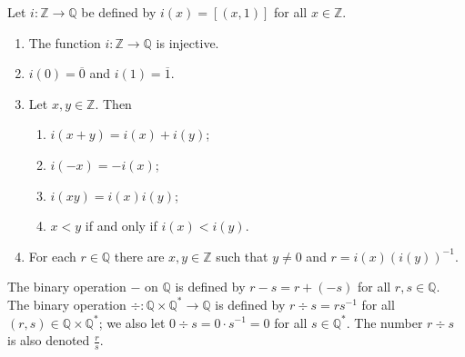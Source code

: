 \begin{theorem} %
	\label{rat:t:int}
	Let $i: \mathbb{Z} \to \mathbb{Q}$ be defined by $i(x) = [(x, 1)]$ for all $x \in \mathbb{Z}$.
	\begin{enumerate}
		\item \label{rat:t:int:injective}
		      The function $i: \mathbb{Z} \to \mathbb{Q}$ is injective.
		\item \label{rat:t:int:zero_one}
		      $i(0) = \overline{0}$ and $i(1) = \overline{1}$.
		\item \label{rat:t:int:props}
		      Let $x, y \in \mathbb{Z}$. Then
		      \begin{enumerate}
			      \item \label{rat:t:int:props:add}
			            $i(x + y) = i(x) + i(y)$;
			      \item \label{rat:t:int:props:neg}
			            $i(-x) = -i(x)$;
			      \item \label{rat:t:int:props:mult}
			            $i(x y) = i(x) i(y)$;
			      \item \label{rat:t:int:props:less}
			            $x < y$ if and only if $i(x) < i(y)$.
		      \end{enumerate}
		\item \label{rat:t:int:div}
		      For each $r \in \mathbb{Q}$ there are $x, y \in \mathbb{Z}$ such that $y \neq 0$ and $r = i(x)(i(y))^{-1}$.
	\end{enumerate}
\end{theorem}

\begin{definition} %
	\label{rat:d:div}
	The binary operation $-$ on $\mathbb{Q}$ is defined by $r - s = r + (-s)$ for all $r, s \in \mathbb{Q}$. The binary operation $\div: \mathbb{Q} \times \mathbb{Q}^{*} \to \mathbb{Q}$ is defined by $r \div s = r s^{-1}$ for all $(r, s) \in \mathbb{Q} \times \mathbb{Q}^{*}$; we also let $0 \div s = 0 \cdot s^{-1} = 0$ for all $s \in \mathbb{Q}^{*}$. The number $r \div s$ is also denoted $\frac{r}{s}$.
\end{definition}

